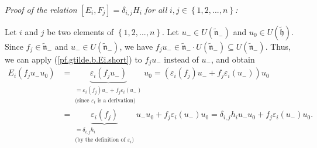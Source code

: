 \documentclass[etingof-lie.tex]{subfiles}
\begin{document}
\textit{Proof of the relation }$\left[  E_{i},F_{j}\right]  =\delta_{i,j}%
H_{i}$ \textit{for all }$i,j\in\left\{  1,2,...,n\right\}  $\textit{:}

\begin{vershort}
Let $i$ and $j$ be two elements of $\left\{  1,2,...,n\right\}  $. Let
$u_{-}\in U\left(  \widetilde{\mathfrak{n}}_{-}\right)  $ and $u_{0}\in
U\left(  \widetilde{\mathfrak{h}}\right)  $. Since $f_{j}\in
\widetilde{\mathfrak{n}}_{-}$ and $u_{-}\in U\left(  \widetilde{\mathfrak{n}%
}_{-}\right)  $, we have $f_{j}u_{-}\in\widetilde{\mathfrak{n}}_{-}\cdot
U\left(  \widetilde{\mathfrak{n}}_{-}\right)  \subseteq U\left(
\widetilde{\mathfrak{n}}_{-}\right)  $. Thus, we can apply
(\ref{pf.gtilde.b.Ei.short}) to $f_{j}u_{-}$ instead of $u_{-}$, and obtain%
\begin{align*}
E_{i}\left(  f_{j}u_{-}u_{0}\right)   &  =\underbrace{\varepsilon_{i}\left(
f_{j}u_{-}\right)  }_{\substack{=\varepsilon_{i}\left(  f_{j}\right)
u_{-}+f_{j}\varepsilon_{i}\left(  u_{-}\right)  \\\text{(since }%
\varepsilon_{i}\text{ is a derivation)}}}u_{0}=\left(  \varepsilon_{i}\left(
f_{j}\right)  u_{-}+f_{j}\varepsilon_{i}\left(  u_{-}\right)  \right)  u_{0}\\
&  =\underbrace{\varepsilon_{i}\left(  f_{j}\right)  }_{\substack{=\delta
_{i,j}h_{i}\\\text{(by the definition of }\varepsilon_{i}\text{)}}}u_{-}%
u_{0}+f_{j}\varepsilon_{i}\left(  u_{-}\right)  u_{0}=\delta_{i,j}h_{i}%
u_{-}u_{0}+f_{j}\varepsilon_{i}\left(  u_{-}\right)  u_{0}.
\end{align*}

\end{vershort}
\end{document}
